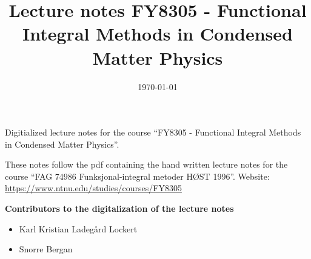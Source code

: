 \documentclass{article}
\title{Lecture notes FY8305 - Functional Integral Methods in Condensed Matter Physics}
\date{\today}
\theoremstyle{definition}
\newcommand{\contribs}{%
\begin{center}
\large 
\textbf{Contributors to the digitalization of the lecture notes}
\end{center}
\begin{itemize}
\item Karl Kristian Ladegård Lockert
\item Snorre Bergan
\end{itemize}

}
\begin{document}
\maketitle
\newpage
Digitialized lecture notes for the course ``FY8305 - Functional Integral Methods in Condensed Matter Physics''.

These notes follow the pdf containing the hand written lecture notes for the course ``FAG 74986 Funksjonal-integral metoder HØST 1996''.
Website: \href{https://www.ntnu.edu/studies/courses/FY8305}{https://www.ntnu.edu/studies/courses/FY8305}
\contribs
\tableofcontents








%
%












\end{document}
